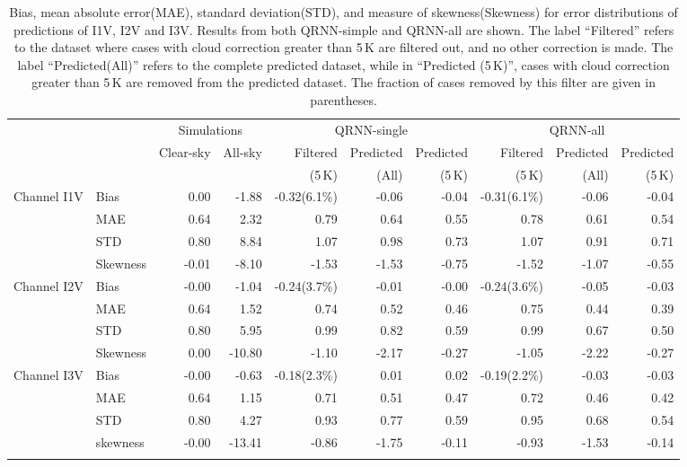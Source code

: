 \documentclass[amt, manuscript]{copernicus}
\begin{document}
\begin{table}[t]
	\caption{Bias, mean absolute error(MAE), standard deviation(STD), and measure of skewness(Skewness) for error distributions of predictions of I1V, I2V and I3V. Results from both QRNN-simple and QRNN-all are shown. The label ``Filtered'' refers to the dataset where cases with cloud correction greater than 5\,K are filtered out, and  no other correction is made. The label ``Predicted(All)'' refers to the complete predicted dataset, while in ``Predicted (5\,K)'', cases with cloud correction greater than 5\,K are removed from the predicted dataset. The fraction of cases removed by this filter are given in parentheses.}
	\label{tab:error_statistics_ici}
	\begin{tabular}{llrr|rrr|rrr}
		\tophline
		&&\multicolumn{2}{c|}{Simulations}& \multicolumn{3}{c|}{QRNN-single} & \multicolumn{3}{c}{QRNN-all}\\
		\cline{3-10}
		&&   Clear-sky &   All-sky &  Filtered & Predicted & Predicted &   Filtered & Predicted & Predicted \\
		&&&&							(5\,K) &(All)& (5\,K) & (5\,K)&(All)& (5\,K)\\
		\middlehline

Channel I1V& Bias     &  0.00 & -1.88 & -0.32(6.1\%) & -0.06 & -0.04 & -0.31(6.1\%) & -0.06 & -0.04 \\
			&MAE      &  0.64 &  2.32 &  0.79 &  0.64 &  0.55 &  0.78 &  0.61 &  0.54 \\
			&STD      &  0.80 &  8.84 &  1.07 &  0.98 &  0.73 &  1.07 &  0.91 &  0.71 \\
			&Skewness & -0.01 & -8.10 & -1.53 & -1.53 & -0.75 & -1.52 & -1.07 & -0.55 \\
\middlehline
Channel I2V &Bias     & -0.00 &  -1.04 & -0.24(3.7\%) & -0.01 & -0.00 & -0.24(3.6\%) & -0.05 & -0.03 \\
			&MAE      &  0.64 &   1.52 &  0.74 &  0.52 &  0.46 &  0.75 &  0.44 &  0.39 \\
			&STD      &  0.80 &   5.95 &  0.99 &  0.82 &  0.59 &  0.99 &  0.67 &  0.50 \\
			&Skewness &  0.00 & -10.80 & -1.10 & -2.17 & -0.27 & -1.05 & -2.22 & -0.27 \\
\middlehline	
Channel I3V &Bias     & -0.00 &  -0.63 & -0.18(2.3\%) &  0.01 &  0.02 & -0.19(2.2\%) & -0.03 & -0.03 \\
			&MAE      &  0.64 &   1.15 &  0.71 &  0.51 &  0.47 &  0.72 &  0.46 &  0.42 \\
			&STD      &  0.80 &   4.27 &  0.93 &  0.77 &  0.59 &  0.95 &  0.68 &  0.54 \\
			&skewness & -0.00 & -13.41 & -0.86 & -1.75 & -0.11 & -0.93 & -1.53 & -0.14 \\
		\bottomhline
	\end{tabular}
	\belowtable{} %
\end{table}
\end{document}
